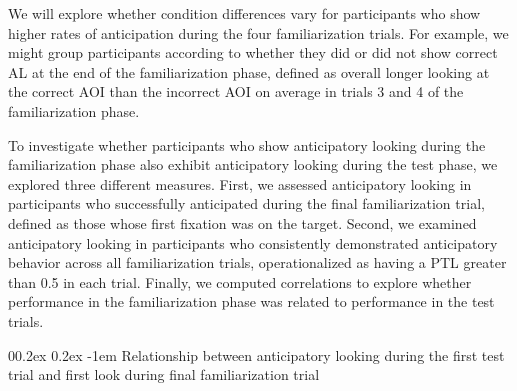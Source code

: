 \documentclass[
  man,floatsintext]{apa6}
\makeatletter
\let\oldparagraph\paragraph
\renewcommand{\paragraph}{
    \@ifstar
      \xxxParagraphStar
      \xxxParagraphNoStar
  }
\newcommand{\xxxParagraphStar}[1]{\oldparagraph*{#1}\mbox{}}
\newcommand{\xxxParagraphNoStar}[1]{\oldparagraph{#1}\mbox{}}
\renewcommand{\paragraph}{\@startsection{paragraph}{4}{\parindent}%
  {0\baselineskip \@plus 0.2ex \@minus 0.2ex}%
  {-1em}%
  {\normalfont\normalsize\bfseries\itshape\typesectitle}}
\makeatother
\begin{document}
We will explore whether condition differences vary for participants who show higher rates of anticipation during the four familiarization trials. For example, we might group participants according to whether they did or did not show correct AL at the end of the familiarization phase, defined as overall longer looking at the correct AOI than the incorrect AOI on average in trials 3 and 4 of the familiarization phase.

To investigate whether participants who show anticipatory looking during the familiarization phase also exhibit anticipatory looking during the test phase, we explored three different measures. First, we assessed anticipatory looking in participants who successfully anticipated during the final familiarization trial, defined as those whose first fixation was on the target. Second, we examined anticipatory looking in participants who consistently demonstrated anticipatory behavior across all familiarization trials, operationalized as having a PTL greater than 0.5 in each trial. Finally, we computed correlations to explore whether performance in the familiarization phase was related to performance in the test trials.

\paragraph{Relationship between anticipatory looking during the first test trial and first look during final familiarization trial}\label{relationship-between-anticipatory-looking-during-the-first-test-trial-and-first-look-during-final-familiarization-trial}
\end{document}
